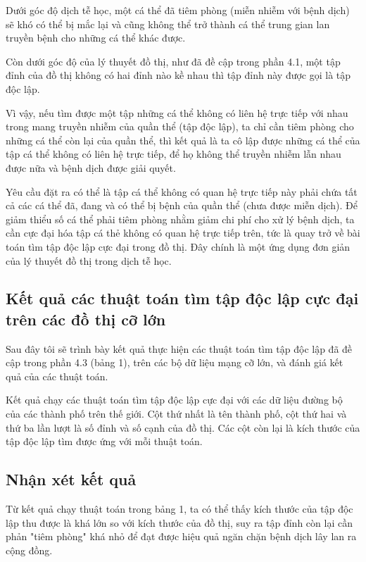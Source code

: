 \documentclass[14pt, oneside, a4paper, openany]{scrartcl}
\begin{document}
Dưới góc độ dịch tễ học, một cá thể đã tiêm phòng (miễn nhiễm với bệnh dịch) sẽ khó có thể bị mắc lại và cũng không thể trở thành cá thể trung gian lan truyền bệnh cho những cá thể khác được. 

Còn dưới góc độ của lý thuyết đồ thị, như đã đề cập trong phần 4.1, một tập đỉnh của đồ thị không có hai đỉnh nào kề nhau thì tập đỉnh này được gọi là tập độc lập. 

Vì vậy, nếu tìm được một tập những cá thể không có liên hệ trực tiếp với nhau trong mang truyền nhiễm của quần thể (tập độc lập), ta chỉ cần tiêm phòng cho những cá thể còn lại của quần thể, thì kết quả là ta cô lập được những cá thể của tập cá thể không có liên hệ trực tiếp, để họ không thể truyền nhiễm lẫn nhau được nữa và bệnh dịch được giải quyết.

Yêu cầu đặt ra có thể là tập cá thể không có quan hệ trực tiếp này phải chứa tất cả các cá thể đã, đang và có thể bị bệnh của quần thể (chưa được miễn dịch). Để giảm thiểu số cá thể phải tiêm phòng nhằm giảm chi phí cho xử lý bệnh dịch, ta cần cực đại hóa tập cá thẻ không có quan hệ trực tiếp trên, tức là quay trở về bài toán tìm tập độc lập cực đại trong đồ thị.
Đây chính là một ứng dụng đơn giản của lý thuyết đồ thị trong dịch tễ học.

\subsection{Kết quả các thuật toán tìm tập độc lập cực đại trên các đồ thị cỡ lớn}
Sau đây tôi sẽ trình bày kết quả thực hiện các thuật toán tìm tập độc lập đã đề cập trong phần 4.3 (bảng 1), trên các bộ dữ liệu mạng cỡ lớn, và đánh giá kết quả của các thuật toán.

\begin{table}[!h]
	\caption[độ chính xác của các phương pháp trên các dữ liệu kiểm thử]{Kết quả chạy các thuật toán tìm tập độc lập cực đại với các dữ liệu đường bộ của các thành phố trên thế giới. Cột thứ nhất là tên thành phố, cột thứ hai và thứ ba lần lượt là số đỉnh và số cạnh của đồ thị. Các cột còn lại là kích thước của tập độc lập tìm được ứng với mỗi thuật toán.}
	\centering
\end{table}

\subsection{Nhận xét kết quả}
Từ kết quả chạy thuật toán trong bảng 1, ta có thể thấy kích thước của tập độc lập thu được là khá lớn so với kích thước của đồ thị, suy ra tập đỉnh còn lại cần phản "tiêm phòng" khá nhỏ để đạt được hiệu quả ngăn chặn bệnh dịch lây lan ra cộng đồng.
\end{document}
